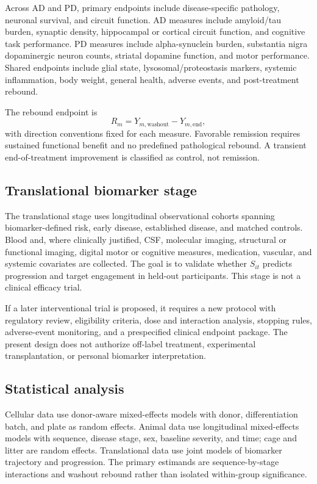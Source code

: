 \documentclass[conference]{IEEEtran}
\begin{document}
Across AD and PD, primary endpoints include disease-specific pathology, neuronal survival, and circuit function. AD measures include amyloid/tau burden, synaptic density, hippocampal or cortical circuit function, and cognitive task performance. PD measures include alpha-synuclein burden, substantia nigra dopaminergic neuron counts, striatal dopamine function, and motor performance. Shared endpoints include glial state, lysosomal/proteostasis markers, systemic inflammation, body weight, general health, adverse events, and post-treatment rebound.

The rebound endpoint is
\begin{equation}
R_m=Y_{m,\mathrm{washout}}-Y_{m,\mathrm{end}},
\label{eq:rebound}
\end{equation}
with direction conventions fixed for each measure. Favorable remission requires sustained functional benefit and no predefined pathological rebound. A transient end-of-treatment improvement is classified as control, not remission.

\subsection{Translational biomarker stage}
The translational stage uses longitudinal observational cohorts spanning biomarker-defined risk, early disease, established disease, and matched controls. Blood and, where clinically justified, CSF, molecular imaging, structural or functional imaging, digital motor or cognitive measures, medication, vascular, and systemic covariates are collected. The goal is to validate whether $S_{it}$ predicts progression and target engagement in held-out participants. This stage is not a clinical efficacy trial.

If a later interventional trial is proposed, it requires a new protocol with regulatory review, eligibility criteria, dose and interaction analysis, stopping rules, adverse-event monitoring, and a prespecified clinical endpoint package. The present design does not authorize off-label treatment, experimental transplantation, or personal biomarker interpretation.

\subsection{Statistical analysis}
Cellular data use donor-aware mixed-effects models with donor, differentiation batch, and plate as random effects. Animal data use longitudinal mixed-effects models with sequence, disease stage, sex, baseline severity, and time; cage and litter are random effects. Translational data use joint models of biomarker trajectory and progression. The primary estimands are sequence-by-stage interactions and washout rebound rather than isolated within-group significance.
\end{document}
